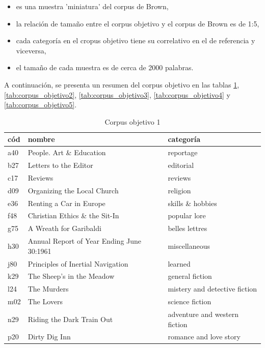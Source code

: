 \documentclass[12pt,letterpaper,twoside]{article}
\begin{document}
\begin{itemize}
\item es una muestra 'miniatura' del corpus de Brown,
\item la relación de tamaño entre el corpus objetivo y el corpus de Brown es de 1:5,
\item cada categoría en el cropus objetivo tiene su correlativo en el de referencia y viceversa,
\item el tamaño de cada muestra es de cerca de 2000 palabras.
\end{itemize}

A continuación, se presenta un resumen del corpus objetivo en las
tablas \ref{tab:corpus_objetivo1},
\ref{tab:corpus_objetivo2}, \ref{tab:corpus_objetivo3},
\ref{tab:corpus_objetivo4} y \ref{tab:corpus_objetivo5}.

\small

   \begin{table}[!ht]
    \centering

    \begin{tabular}{|l|l|l|}
    \hline
	cód & nombre & categoría \\ \hline
      a40 & People. Art \& Education & reportage \\ \hline
      b27 & Letters to the Editor & editorial \\ \hline
      c17 & Reviews & reviews \\ \hline
      d09 & Organizing the Local Church & religion \\ \hline
      e36 & Renting a Car in Europe & skills \& hobbies \\ \hline
      f48 & Christian Ethics \& the Sit-In & popular lore \\ \hline
      g75 & A Wreath for Garibaldi & belles lettres \\ \hline
      h30 & Annual Report of Year Ending June 30:1961 & miscellaneous \\ \hline
      j80 & Principles of Inertial Navigation & learned \\ \hline
      k29 & The Sheep's in the Meadow & general fiction \\ \hline
      l24 & The Murders & mistery and detective fiction \\ \hline
      m02 & The Lovers & science fiction \\ \hline
      n29 & Riding the Dark Train Out & adventure and western fiction \\ \hline
      p20 & Dirty Dig Inn & romance and love story \\ \hline
    \end{tabular}
\caption{Corpus objetivo 1}
\label{tab:corpus_objetivo1}
\end{table}
\end{document}
